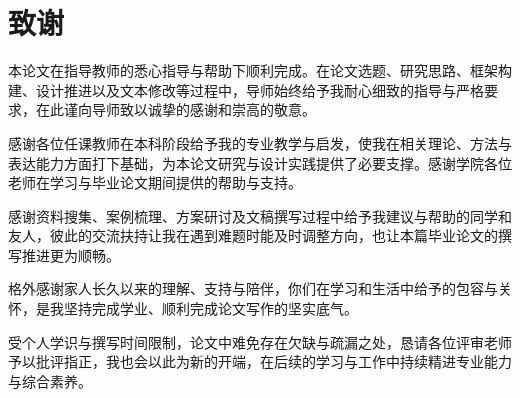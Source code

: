 \chapter{致谢}

本论文在指导教师的悉心指导与帮助下顺利完成。在论文选题、研究思路、框架构建、设计推进以及文本修改等过程中，导师始终给予我耐心细致的指导与严格要求，在此谨向导师致以诚挚的感谢和崇高的敬意。

感谢各位任课教师在本科阶段给予我的专业教学与启发，使我在相关理论、方法与表达能力方面打下基础，为本论文研究与设计实践提供了必要支撑。感谢学院各位老师在学习与毕业论文期间提供的帮助与支持。

感谢资料搜集、案例梳理、方案研讨及文稿撰写过程中给予我建议与帮助的同学和友人，彼此的交流扶持让我在遇到难题时能及时调整方向，也让本篇毕业论文的撰写推进更为顺畅。

格外感谢家人长久以来的理解、支持与陪伴，你们在学习和生活中给予的包容与关怀，是我坚持完成学业、顺利完成论文写作的坚实底气。

受个人学识与撰写时间限制，论文中难免存在欠缺与疏漏之处，恳请各位评审老师予以批评指正，我也会以此为新的开端，在后续的学习与工作中持续精进专业能力与综合素养。
